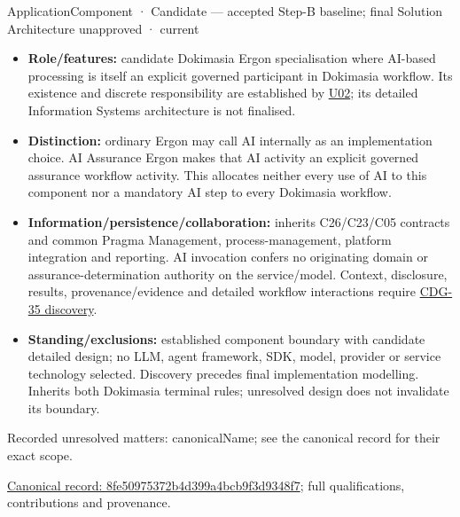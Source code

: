 \label{element:8fe50975372b4d399a4bcb9f3d9348f7}
{\small ApplicationComponent · Candidate — accepted Step-B baseline; final Solution Architecture unapproved · current}\par

\begin{itemize}


\item \textbf{Role/features:} candidate Dokimasia Ergon specialisation where AI-based
  processing is itself an explicit governed participant in Dokimasia workflow.
  Its existence and discrete responsibility are established by \href{\detokenize{../../../../../docs/markdown/05-information-systems-architecture/sources.md#u02}}{U02};
  its detailed Information Systems architecture is not finalised.

\item \textbf{Distinction:} ordinary Ergon may call AI internally as an implementation
  choice. AI Assurance Ergon makes that AI activity an explicit governed assurance
  workflow activity. This allocates neither every use of AI to this component
  nor a mandatory AI step to every Dokimasia workflow.

\item \textbf{Information/persistence/collaboration:} inherits C26/C23/C05 contracts and
  common Pragma Management, process-management, platform integration and reporting.
  AI invocation confers no originating domain or assurance-determination authority
  on the service/model. Context, disclosure, results, provenance/evidence and
  detailed workflow interactions require \href{\detokenize{../../../../../docs/markdown/05-information-systems-architecture/gaps.md#dokimasia-ai-discovery}}{CDG-35 discovery}.

\item \textbf{Standing/exclusions:} established component boundary with candidate detailed
  design; no LLM, agent framework, SDK, model, provider or service technology
  selected. Discovery precedes final implementation modelling. Inherits both
  Dokimasia terminal rules; unresolved design does not invalidate its boundary.

\end{itemize}

{\small Recorded unresolved matters: canonicalName; see the canonical record for their exact scope.}\par
{\footnotesize \href{../../../../continuum/application/application-component/8fe50975372b4d399a4bcb9f3d9348f7.md}{Canonical record: 8fe50975372b4d399a4bcb9f3d9348f7}; full qualifications, contributions and provenance.}\par
